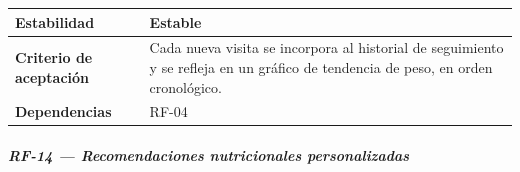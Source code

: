 \documentclass[
]{article}
\begin{document}
{\begin{longtable}[]{|
  >{\raggedright\arraybackslash}p{}|
  >{\raggedright\arraybackslash}p{}|}
\hline
\textbf{Estabilidad} & \begin{minipage}[t]{\linewidth}\raggedright
Estable
\end{minipage} \\
\hline
\textbf{Criterio de aceptación} &
\begin{minipage}[t]{\linewidth}\raggedright
Cada nueva visita se incorpora al historial de seguimiento y se refleja en un gráfico de tendencia de peso, en orden cronológico.
\end{minipage} \\
\hline
\textbf{Dependencias} & \begin{minipage}[t]{\linewidth}\raggedright
RF-04
\end{minipage} \\
\hline
\end{longtable}
}

\subparagraph{RF-14 --- Recomendaciones nutricionales personalizadas}\label{rf-14-recomendaciones-nutricionales-personaliz}
\end{document}
